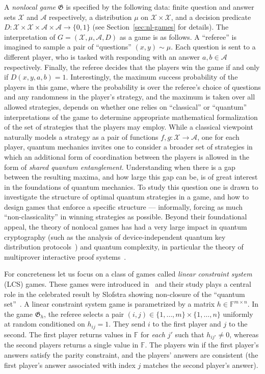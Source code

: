 \documentclass[11pt]{article}
\theoremstyle{definition}
\newcommand{\F}{\ensuremath{\mathbb{F}}}
\newcommand{\mA}{\ensuremath{\mathcal{A}}}
\newcommand{\mX}{\ensuremath{\mathcal{X}}}
\newcommand{\game}{\mathfrak{G}}
\begin{document}
 A \emph{nonlocal game} $\game$ is specified by the following data: finite question and answer sets $\mX$ and $\mA$ respectively, a distribution $\mu$ on $\mX\times \mX$, and a decision predicate $D:\mX\times \mX\times \mA\times \mA\to \{0,1\}$ (see Section~\ref{sec:nl-games} for details). The interpretation of $G=(\mX,\mu,\mA,D)$ as a game is as follows. A ``referee'' is imagined to sample a pair of ``questions'' $(x,y)\sim \mu$. Each question is sent to a different player, who is tasked with responding with an answer $a,b\in \mA$ respectively. Finally, the referee decides that the players win the game if and only if $D(x,y,a,b)=1$. Interestingly, the maximum success probability of the players in this game, where the probability is over the referee's choice of questions and any randomness in the player's strategy, and the maximum is taken over all allowed strategies, depends on whether one relies on ``classical'' or ``quantum'' interpretations of the game to determine appropriate mathematical formalization of the set of strategies that the players may employ. While a classical viewpoint naturally models a strategy as a pair of functions $f,g:\mX\to\mA$, one for each player, quantum mechanics invites one to consider a broader set of strategies in which an additional form of coordination between the players is allowed in the form of \emph{shared quantum entanglement}. Understanding when there is a gap between the resulting maxima, and how large this gap can be, is of great interest in the foundations of quantum mechanics. To study this question one is drawn to investigate the structure of optimal quantum strategies in a game, and how to design games that enforce a specific structure --- informally, forcing as much ``non-classicality'' in winning strategies as possible. Beyond their foundational appeal, the theory of nonlocal games has had a very large impact in quantum cryptography (such as the analysis of device-independent quantum key distribution protocols~\cite{vazirani2019fully,arnon2019simple}) and quantum complexity, in particular the theory of multiprover interactive proof systems~\cite{cleve2004consequences}.

For concreteness let us focus on a class of games called \emph{linear constraint system} (LCS) games. These games were introduced in~\cite{cleve2014characterization} and their study plays a central role in the celebrated result by Slofstra showing non-closure of the ``quantum set''~\cite{slofstra2019set}. A linear constraint system game is parametrized by a matrix $h\in \F^{m\times n}$. In the game $\game_h$, the referee selects a pair $(i,j)\in \{1,\ldots,m\}\times\{1,\ldots,n\}$ uniformly at random conditioned on $h_{ij}=1$. They send $i$ to the first player and $j$ to the second. The first player returns values in $\F$ for \emph{each} $j'$ such that $h_{ij'}\neq 0$, whereas the second players returns a single value in $\F$. The players win if the first player's answers satisfy the parity constraint, and the players' answers are consistent (the first player's answer associated with index $j$ matches the second player's answer). 
\end{document}
